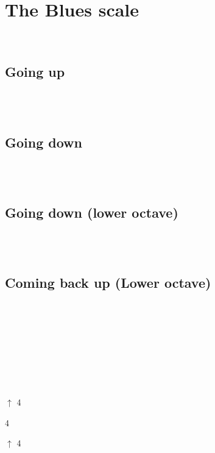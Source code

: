 \section{The Blues scale}\\
\subsection{Going up}\\
\1\3\4\e\5\7\8\\

\subsection{Going down}\\
\8\7\5\e\4\3\1\\
\subsection{Going down (lower octave)}\\
\1\w\q\s\x\\
\subsection{Coming back up (Lower octave)}\\
\x\a\s\w\1

\newpage
\\
\1\1\3\4\e\5\6\7\8\6\8\5\e\8\e \\ 
\1\w\q\s\x




\newpage
\4\4\5 \\
\e\e\5\7\8\7\5\7\8

\1\1\3\4\e\5\\\7\5\7\8\7\5\7\8

\newpage



  $\uparrow$ 4 
  
\newpage
 
  
  4   

  $\uparrow$ 4 

